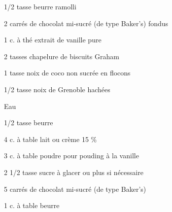 %
%   
%   
%   
%




\totaltime{}


\begin{ingredients}
    \item[] 
    \item 1/2 tasse beurre ramolli
    \item 2 carrés de chocolat mi-sucré (de type Baker's) fondus
    \item 1 c. à thé extrait de vanille pure
    \item 2 tasses chapelure de biscuits Graham
    \item 1 tasse noix de coco non sucrée en flocons
    \item 1/2 tasse noix de Grenoble hachées
    \item Eau
    \\
    \item[] 
    \item 1/2 tasse beurre
    \item 4 c. à table lait ou crème 15 \%
    \item 3 c. à table poudre pour pouding à la vanille
    \item 2 1/2 tasse sucre à glacer ou plus si nécessaire
    \\
    \item[] 
    \item 5 carrés de chocolat mi-sucré (de type Baker's)
    \item 1 c. à table beurre
\end{ingredients}

